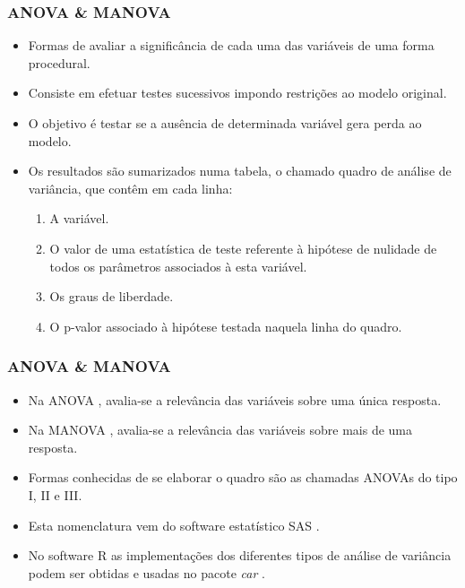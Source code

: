 \documentclass[10pt,
  aspectratio=169,
  serif,
  mathserif,
  professionalfont,
  compress,
  handout,
  ]{beamer}\usepackage[]{graphicx}\usepackage[]{color}
\begin{document}
\begin{frame}
  \frametitle{ANOVA \& MANOVA}

  \begin{itemize}
    \itemsep 2ex

  \item Formas de avaliar a significância de cada uma das variáveis de uma forma procedural.  
  
  \item Consiste em efetuar testes sucessivos impondo restrições ao modelo original. 

  \item O objetivo é testar se a ausência de determinada variável gera perda ao modelo. 
  
  \item Os resultados são sumarizados numa tabela, o chamado quadro de análise de variância, que contêm em cada linha: 
  
  \begin{enumerate}
  \item A variável.
  \item O valor de uma estatística de teste referente à hipótese de nulidade de todos os parâmetros associados à esta variável.
  \item Os graus de liberdade.
  \item O p-valor associado à hipótese testada naquela linha do quadro.
  \end{enumerate}


  \end{itemize}

\end{frame}


\begin{frame}
  \frametitle{ANOVA \& MANOVA}

  \begin{itemize}
    \itemsep 2ex

  \item Na ANOVA \cite{anova_fisher}, avalia-se a relevância das variáveis sobre uma única resposta. 

  \item Na MANOVA \cite{manova}, avalia-se a relevância das variáveis sobre mais de uma resposta. 

  \item Formas conhecidas de se elaborar o quadro são as chamadas ANOVAs do tipo I, II e III. 

  \item Esta nomenclatura vem do software estatístico SAS \cite{sas}. 

  \item No software R \cite{softwareR} as implementações dos diferentes tipos de análise de variância podem ser obtidas e usadas no pacote \emph{car} \cite{car}.
  
  \end{itemize}

\end{frame}
\end{document}
